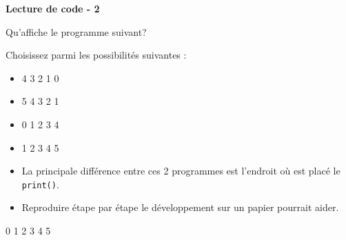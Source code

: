 \begin{Exercice}[5 minutes] \textbf{Lecture de code - 2}
    
	Qu'affiche le programme suivant?
	
	
	Choisissez parmi les possibilités suivantes : \\
	
	\begin{itemize}
	\item 4  
	3 
	2 
	1 
	0 
	\item 5 
	4 
	3 
	2 
	1 
	\item 0 
	1 
	2 
	3 
	4 
	\item 1 
	2 
	3 
	4 
	5
	\end{itemize}
	
	 
	
		\begin{conseil} 
		\begin{itemize} 
			\item La principale différence entre ces 2 programmes est l'endroit où est placé le \lstinline{print()}. 
			\item Reproduire étape par étape le développement sur un papier pourrait aider. 
		\end{itemize} 
		\end{conseil} 
	
		\begin{solution} 
			0  
			1  
			2  
			3  
			4  
			5 
	
		\end{solution} 
	
	\end{Exercice}
